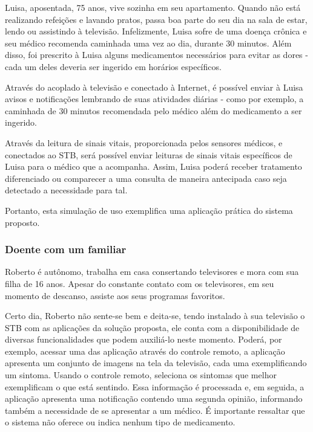 Luisa, aposentada, 75 anos, vive sozinha em seu apartamento. Quando não está
realizando refeições e lavando pratos, passa boa parte do seu dia na sala de
estar, lendo ou assistindo à televisão. Infelizmente, Luisa sofre de uma doença 
crônica e seu médico recomenda caminhada uma vez ao dia, durante 30 minutos. 
Além disso, foi prescrito à Luisa alguns medicamentos necessários para evitar 
as dores - cada um deles deveria ser ingerido em horários específicos.

Através do \stb[] acoplado à televisão e conectado à Internet, é
possível enviar à Luisa avisos e notificações lembrando de suas atividades
diárias - como por exemplo, a caminhada de 30 minutos recomendada pelo
médico além do medicamento a ser ingerido.

Através da leitura de sinais vitais, proporcionada pelos sensores médicos,
e conectados ao STB, será possível enviar leituras de sinais vitais específicos 
de Luisa para o médico que a acompanha. Assim, Luisa poderá receber tratamento
diferenciado ou comparecer a uma consulta de maneira antecipada caso seja
detectado a necessidade para tal.

Portanto, esta simulação de uso exemplifica uma aplicação prática do sistema 
proposto.


\subsubsection{Doente com um familiar} \label{subsubsec:doente-com-familiar}

Roberto é autônomo, trabalha em casa consertando televisores e mora com sua
filha de 16 anos. Apesar do constante contato com os televisores, em seu momento
de descanso, assiste aos seus programas favoritos.

Certo dia, Roberto não sente-se bem e deita-se, tendo instalado à sua televisão
o STB com as aplicações da solução proposta, ele conta com a disponibilidade de
diversas funcionalidades que podem auxiliá-lo neste momento. Poderá, por
exemplo, acessar uma das aplicação através do controle remoto, a aplicação
apresenta um conjunto de imagens na tela da televisão, cada uma exemplificando
um sintoma.  Usando o controle remoto, seleciona os sintomas que melhor
exemplificam o que está sentindo. Essa informação é processada e, em seguida, a
aplicação apresenta uma notificação contendo uma segunda opinião, informando
também a necessidade de se apresentar a um médico. É importante ressaltar que
o sistema não oferece ou indica nenhum tipo de medicamento.

